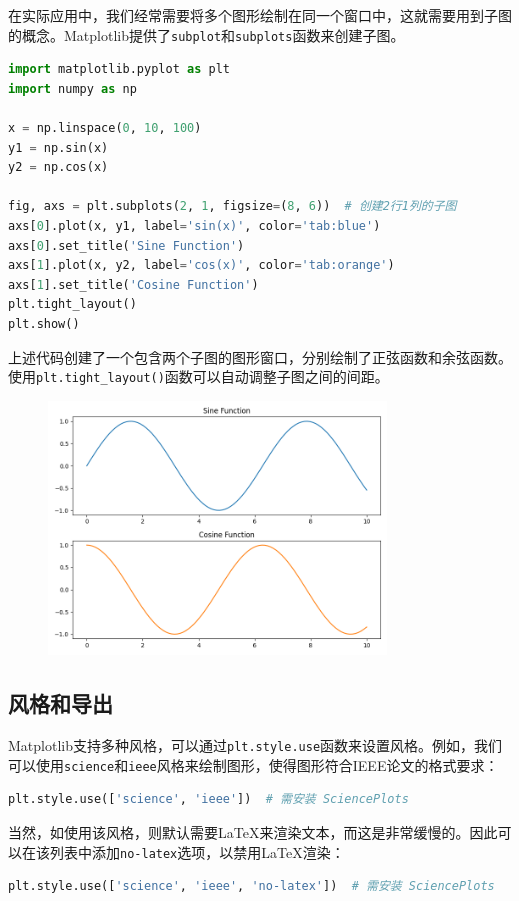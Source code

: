 \documentclass[../main.tex]{subfiles}
\begin{document}
在实际应用中，我们经常需要将多个图形绘制在同一个窗口中，这就需要用到子图的概念。Matplotlib提供了\texttt{subplot}和\texttt{subplots}函数来创建子图。

\begin{lstlisting}[language=python]
import matplotlib.pyplot as plt
import numpy as np

x = np.linspace(0, 10, 100)
y1 = np.sin(x)
y2 = np.cos(x)

fig, axs = plt.subplots(2, 1, figsize=(8, 6))  # 创建2行1列的子图
axs[0].plot(x, y1, label='sin(x)', color='tab:blue')
axs[0].set_title('Sine Function')
axs[1].plot(x, y2, label='cos(x)', color='tab:orange')
axs[1].set_title('Cosine Function')
plt.tight_layout()
plt.show()
\end{lstlisting}
上述代码创建了一个包含两个子图的图形窗口，分别绘制了正弦函数和余弦函数。使用\texttt{plt.tight\_layout()}函数可以自动调整子图之间的间距。

\begin{figure}[htbp]
    \centering
    \includegraphics[width=0.8\textwidth]{images/plt/Figure_4.png}
\end{figure}

\subsection{风格和导出}

Matplotlib支持多种风格，可以通过\texttt{plt.style.use}函数来设置风格。例如，我们可以使用\texttt{science}和\texttt{ieee}风格来绘制图形，使得图形符合IEEE论文的格式要求：
\begin{lstlisting}[language=python]
plt.style.use(['science', 'ieee'])  # 需安装 SciencePlots
\end{lstlisting}
当然，如使用该风格，则默认需要LaTeX来渲染文本，而这是非常缓慢的。因此可以在该列表中添加\texttt{no-latex}选项，以禁用LaTeX渲染：
\begin{lstlisting}[language=python]
plt.style.use(['science', 'ieee', 'no-latex'])  # 需安装 SciencePlots
\end{lstlisting}
\end{document}
